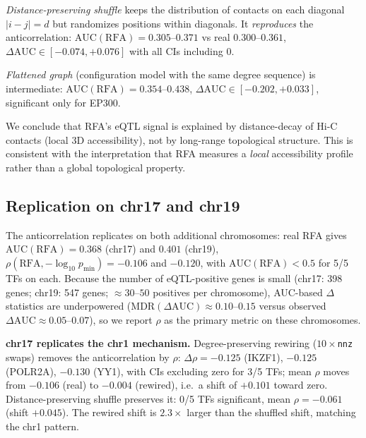 \documentclass[11pt,a4paper]{article}
\begin{document}
\emph{Distance-preserving shuffle} keeps the distribution of contacts on each diagonal $|i-j|=d$ but randomizes positions within diagonals. It \emph{reproduces} the anticorrelation: $\mathrm{AUC}(\mathrm{RFA}) = 0.305$--$0.371$ vs real $0.300$--$0.361$, $\Delta\mathrm{AUC} \in [-0.074, +0.076]$ with all CIs including 0.

\emph{Flattened graph} (configuration model with the same degree sequence) is intermediate: $\mathrm{AUC}(\mathrm{RFA}) = 0.354$--$0.438$, $\Delta\mathrm{AUC} \in [-0.202, +0.033]$, significant only for EP300.

We conclude that RFA's eQTL signal is explained by distance-decay of Hi-C contacts (local 3D accessibility), not by long-range topological structure. This is consistent with the interpretation that RFA measures a \emph{local} accessibility profile rather than a global topological property.

\subsection{Replication on chr17 and chr19}\label{sec:topology_chr17_19}

The anticorrelation replicates on both additional chromosomes: real RFA gives
$\mathrm{AUC}(\mathrm{RFA})=0.368$ (chr17) and $0.401$ (chr19),
$\rho(\mathrm{RFA}, -\log_{10}p_{\min}) = -0.106$ and $-0.120$,
with $\mathrm{AUC}(\mathrm{RFA})<0.5$ for 5/5 TFs on each.
Because the number of eQTL-positive genes is small (chr17: 398 genes;
chr19: 547 genes; $\approx 30$--$50$ positives per chromosome), AUC-based
$\Delta$ statistics are underpowered
($\mathrm{MDR}(\Delta\mathrm{AUC})\approx 0.10$--$0.15$ versus observed
$\Delta\mathrm{AUC}\approx 0.05$--$0.07$), so we report
$\rho$ as the primary metric on these chromosomes.

\textbf{chr17 replicates the chr1 mechanism.}
Degree-preserving rewiring ($10\times$\texttt{nnz} swaps) removes the
anticorrelation by $\rho$: $\Delta\rho = -0.125$ (IKZF1),
$-0.125$ (POLR2A), $-0.130$ (YY1), with CIs excluding zero for 3/5 TFs;
mean $\rho$ moves from $-0.106$ (real) to $-0.004$ (rewired), i.e.\ a shift
of $+0.101$ toward zero. Distance-preserving shuffle preserves it:
0/5 TFs significant, mean $\rho=-0.061$ (shift $+0.045$).
The rewired shift is $2.3\times$ larger than the shuffled shift,
matching the chr1 pattern.
\end{document}
